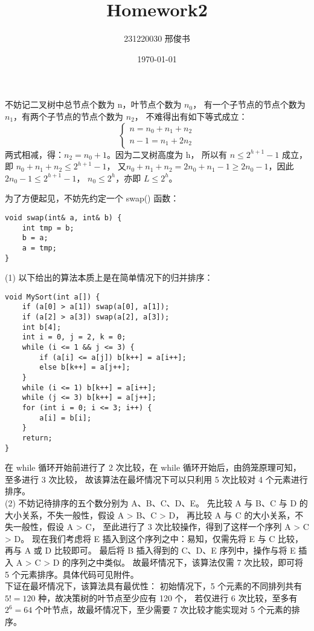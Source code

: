 \documentclass[12pt, a4paper, oneside]{ctexart}
\title{\textbf{Homework2}}
\author{231220030 邢俊书}
\date{\today}
\begin{document}
\maketitle
\begin{solution}[4.1]
不妨记二叉树中总节点个数为 n，叶节点个数为 $n_0$，
有一个子节点的节点个数为 $n_1$，有两个子节点的节点个数为 $n_2$，
不难得出有如下等式成立：
\[
\begin{cases}
    n = n_0 + n_1 + n_2 \\
    n - 1 = n_1 + 2n_2
\end{cases}
\]
两式相减，得：$n_2 = n_0 + 1$。因为二叉树高度为 h，
所以有 $n \leq 2^{h + 1} - 1$ 成立，即 $n_0 + n_1 + n_2 \leq 2^{h + 1} - 1$，
又$n_0 + n_1 + n_2 = 2n_0 + n_1 - 1 \geq 2n_0 - 1$，因此 $2n_0 - 1 \leq 2^{h + 1} - 1$，
$n_0 \leq 2^h$，亦即 $L \leq 2^h$。
\end{solution}

\begin{solution}[4.4]
为了方便起见，不妨先约定一个 swap() 函数：
\begin{verbatim}
void swap(int& a, int& b) {
    int tmp = b;
    b = a;
    a = tmp;
}
\end{verbatim}
\newpage
(1) 以下给出的算法本质上是在简单情况下的归并排序：
\begin{verbatim}
void MySort(int a[]) {
    if (a[0] > a[1]) swap(a[0], a[1]);
    if (a[2] > a[3]) swap(a[2], a[3]);
    int b[4];
    int i = 0, j = 2, k = 0;
    while (i <= 1 && j <= 3) {
        if (a[i] <= a[j]) b[k++] = a[i++];
        else b[k++] = a[j++];
    }
    while (i <= 1) b[k++] = a[i++];
    while (j <= 3) b[k++] = a[j++];
    for (int i = 0; i <= 3; i++) {
        a[i] = b[i];
    }
    return;
}
\end{verbatim}
在 while 循环开始前进行了 2 次比较，在 while 循环开始后，由鸽笼原理可知，至多进行 3 次比较，
故该算法在最坏情况下可以只利用 5 次比较对 4 个元素进行排序。
\\(2) 不妨记待排序的五个数分别为 A、B、C、D、E。
先比较 A 与 B、C 与 D 的大小关系，不失一般性，假设 A > B、C > D，
再比较 A 与 C 的大小关系，不失一般性，假设 A > C，
至此进行了 3 次比较操作，得到了这样一个序列 A > C > D。
现在我们考虑将 E 插入到这个序列之中：易知，仅需先将 E 与 C 比较，再与 A 或 D 比较即可。
最后将 B 插入得到的 C、D、E 序列中，操作与将 E 插入 A > C > D 的序列之中类似。
故最坏情况下，该算法仅需 7 次比较，即可将 5 个元素排序。具体代码可见附件。
\\下证在最坏情况下，该算法具有最优性：
初始情况下，5 个元素的不同排列共有 $5! = 120$ 种，故决策树的叶节点至少应有 120 个，
若仅进行 6 次比较，至多有 $2^6 = 64$ 个叶节点，故最坏情况下，至少需要 7 次比较才能实现对 5 个元素的排序。
\end{solution}
\end{document}
